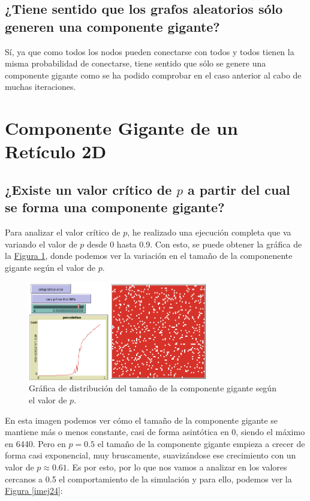 \documentclass[paper=a4, fontsize=11pt]{article} %
\numberwithin{equation}{section} %
\numberwithin{figure}{section} %
\numberwithin{table}{section} %
\begin{document}
\subsection{¿Tiene sentido que los grafos aleatorios sólo generen una componente gigante?}

Sí, ya que como todos los nodos pueden conectarse con todos y todos tienen la misma probabilidad de conectarse, tiene sentido que sólo se genere una componente gigante como se ha podido comprobar en el caso anterior al cabo de muchas iteraciones.

\section{Componente Gigante de un Retículo 2D}

\subsection{¿Existe un valor crítico de $p$ a partir del cual se forma una componente gigante?}

Para analizar el valor crítico de $p$, he realizado una ejecución completa que va variando el valor de $p$ desde 0 hasta 0.9. Con esto, se puede obtener la gráfica de la \hyperref[im18]{Figura \ref{im18}}, donde podemos ver la variación en el tamaño de la componenente gigante según el valor de $p$.

\begin{figure}[H]
  \centering
  \includegraphics[width=0.7\textwidth]{img/im18}
  \caption{Gráfica de distribución del tamaño de la componente gigante según el valor de $p$.}
  \label{im18}
\end{figure}

En esta imagen podemos ver cómo el tamaño de la componente gigante se mantiene más o menos constante, casi de forma asintótica en 0, siendo el máximo en 6440. Pero en $p=0.5$ el tamaño de la componente gigante empieza a crecer de forma casi exponencial, muy bruscamente, suavizándose ese crecimiento con un valor de $p \approx 0.61$. Es por esto, por lo que nos vamos a analizar en los valores cercanos a 0.5 el comportamiento de la simulación y para ello, podemos ver la \hyperref[imej24]{Figura \ref{imej24}}:
\end{document}
